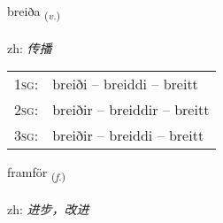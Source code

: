\documentclass[frontgrid, backgrid]{flacards}\usepackage[]{graphicx}\usepackage[]{color}
\begin{document}
\renewcommand{\flhead}{\vskip5pt \fboxsep=0pt {\small\bfseries\footnotesize Sagnorð | 动词}}
\renewcommand{\fcfoot}{\vskip5pt \fboxsep=0pt \hspace{2pt}{\small\bfseries\footnotesize 2K}}

\renewcommand{\blhead}{\vskip5pt {\small\bfseries\footnotesize Sagnorð | 动词 }}
\renewcommand{\bcfoot}{\vskip5pt \hspace{2pt}{\small\bfseries\footnotesize 2K}}


{breiða \small{\textsubscript{(\textit{v.})}} \\[1ex] %
\textphonetic{[preiːða]} \\
zh: \emph{传播} \\  [2ex]
\renewcommand*{\arraystretch}{0.8}
\begin{tabular}{p{1cm}l}
\textsc{1sg}: & breiði -- breiddi -- breitt \\ 
\textsc{2sg}: & breiðir -- breiddir -- breitt \\ 
\textsc{3sg}: & breiðir -- breiddi -- breitt \\ 
\end{tabular}
}

\renewcommand{\flhead}{\vskip5pt \fboxsep=0pt {\small\bfseries\footnotesize Nafnorð | 名词}}
\renewcommand{\fcfoot}{\vskip5pt \fboxsep=0pt \hspace{2pt}{\small\bfseries\footnotesize 2K}}

\renewcommand{\blhead}{\vskip5pt {\small\bfseries\footnotesize Nafnorð | 名词 }}
\renewcommand{\bcfoot}{\vskip5pt \hspace{2pt}{\small\bfseries\footnotesize 2K}}


{framför \small{\textsubscript{(\textit{f.})}} \\[1ex] %
\textphonetic{[framfœr]} \\
zh: \emph{进步，改进} \\  [2ex]
\renewcommand*{\arraystretch}{0.8}
}
\end{document}
